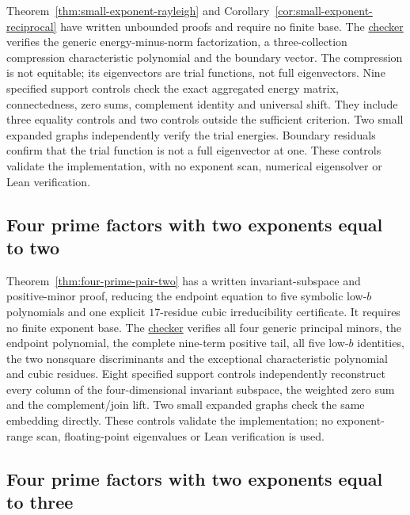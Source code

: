 Theorem~\ref{thm:small-exponent-rayleigh} and
Corollary~\ref{cor:small-exponent-reciprocal} have written unbounded
proofs and require no finite base. The
\href{https://github.com/the-omega-institute/ideal-intersection-laplacian/blob/295fffdd14afb3d5ef54e5fbbf02c31347ecb51d/scripts/check_small_exponent_rayleigh.py}{checker}
verifies the generic energy-minus-norm factorization, a three-collection
compression characteristic polynomial and the boundary vector.
The compression is not equitable; its eigenvectors are trial functions,
not full eigenvectors. Nine specified support controls check the exact
aggregated energy matrix, connectedness, zero sums, complement identity
and universal shift. They include three equality controls and two
controls outside the sufficient criterion. Two small expanded graphs
independently verify the trial energies. Boundary residuals confirm
that the trial function is not a full eigenvector at one. These
controls validate the implementation, with no exponent scan, numerical
eigensolver or Lean verification.

\subsection{Four prime factors with two exponents equal to two}

Theorem~\ref{thm:four-prime-pair-two} has a written invariant-subspace
and positive-minor proof, reducing the endpoint equation to five
symbolic low-$b$ polynomials and one explicit $17$-residue cubic
irreducibility certificate. It requires no finite exponent base.
The
\href{https://github.com/the-omega-institute/ideal-intersection-laplacian/blob/8684d83aefc0dac63ebab8c078421ab499e19ab9/scripts/check_four_prime_pair_two.py}{checker}
verifies all four generic principal minors, the endpoint polynomial,
the complete nine-term positive tail, all five low-$b$ identities,
the two nonsquare discriminants and the exceptional characteristic
polynomial and cubic residues. Eight specified support controls
independently reconstruct every column of the four-dimensional
invariant subspace, the weighted zero sum and the complement/join
lift. Two small expanded graphs check the same embedding directly.
These controls validate the implementation; no exponent-range scan,
floating-point eigenvalues or Lean verification is used.

\subsection{Four prime factors with two exponents equal to three}

